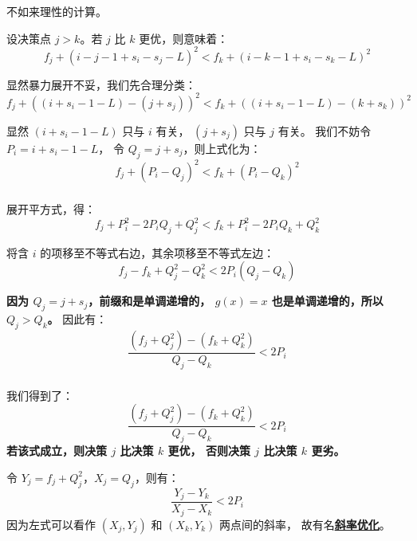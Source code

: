 \documentclass[9pt, UTF8]{beamer} %
\newcommand \fts {\frametitle{\insertsubsection}}
\newcommand \bpause { \bigskip \pause }
\begin{document}
	\begin{frame}
		\fts

		不如来理性的计算。

		\bpause

		设决策点 $j > k$。若 $j$ 比 $k$ 更优，则意味着：
		$$
		f_j + (i - j - 1 + s_i - s_j - L)^2 <
		f_k + (i - k - 1 + s_i - s_k - L)^2
		$$

		\pause

		显然暴力展开不妥，我们先合理分类：
		$$
		f_j + ((i + s_i - 1 - L) - (j + s_j))^2 <
		f_k + ((i + s_i - 1 - L) - (k + s_k))^2
		$$

		\pause

		显然 $(i + s_i - 1 - L)$ 只与 $i$ 有关，
		$(j + s_j)$ 只与 $j$ 有关。
		我们不妨令 $P_i = i + s_i - 1 - L$，
		令 $Q_j = j + s_j$，则上式化为：
		$$
		f_j + (P_i - Q_j)^2 <
		f_k + (P_i - Q_k)^2
		$$
	\end{frame}

	\begin{frame}
		\fts

		展开平方式，得：
		$$
		f_j + P_i^2 - 2 P_i Q_j + Q_j^2 <
		f_k + P_i^2 - 2 P_i Q_k + Q_k^2
		$$

		\pause

		将含 $i$ 的项移至不等式右边，其余项移至不等式左边：
		$$
		f_j - f_k + Q_j^2 - Q_k^2 < 2 P_i (Q_j - Q_k)
		$$

		\pause

		\textbf{因为 $Q_j = j + s_j$，前缀和是单调递增的，
		$g(x) = x$ 也是单调递增的，所以 $Q_j > Q_k$。}
		因此有：
		$$
		\frac {(f_j + Q_j^2) - (f_k + Q_k^2)} {Q_j - Q_k} < 2 P_i
		$$
	\end{frame}

	\begin{frame}
		\fts

		我们得到了：
		$$
		\frac {(f_j + Q_j^2) - (f_k + Q_k^2)} {Q_j - Q_k} < 2 P_i
		$$
		\textbf{若该式成立，则决策 $j$ 比决策 $k$ 更优，
		否则决策 $j$ 比决策 $k$ 更劣。}

		\bpause

		令 $Y_j = f_j + Q_j^2$，$X_j = Q_j$，则有：
		$$
		\frac {Y_j - Y_k} {X_j - X_k} < 2 P_i
		$$
		因为左式可以看作 $(X_j, Y_j)$ 和 $(X_k, Y_k)$ 两点间的斜率，
		故有名\textbf{\uline{斜率优化}}。
	\end{frame}
\end{document}
